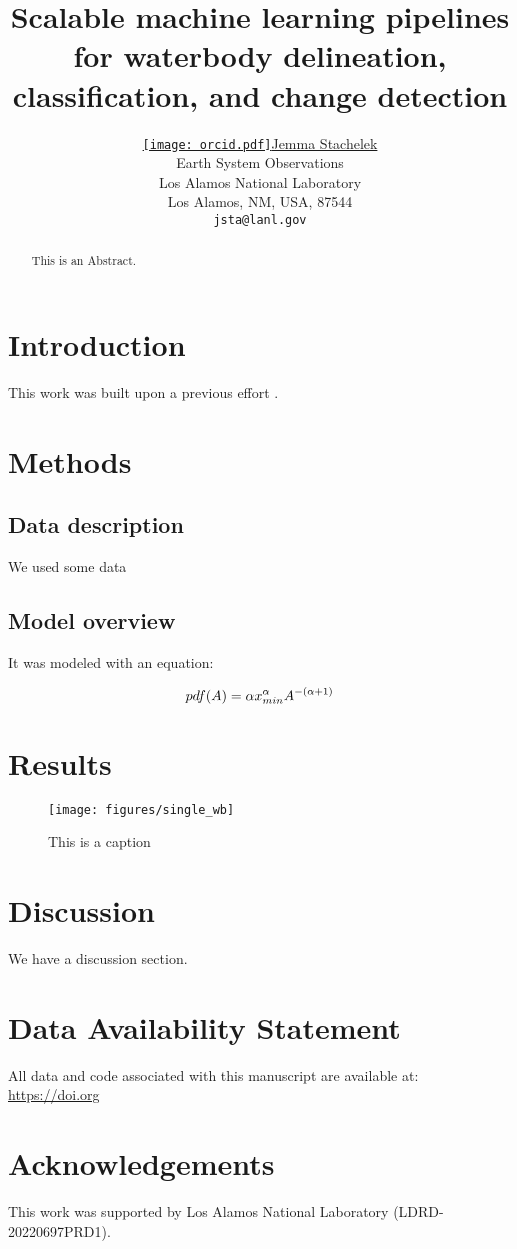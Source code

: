 \documentclass{article}
\title{Scalable machine learning pipelines for waterbody delineation, classification, and change detection}
\date{} 					%
\author{ \href{https://orcid.org/0000-0002-5924-2464}{\texttt{[image: orcid.pdf]}\hspace{1mm}Jemma Stachelek} \\
	Earth System Observations\\
	Los Alamos National Laboratory\\
	Los Alamos, NM, USA, 87544 \\
	\texttt{jsta@lanl.gov} \\
}
\begin{document}
\maketitle

\begin{abstract}
	This is an Abstract.
\end{abstract}

\section{Introduction}
This work was built upon a previous effort \citep{stachelek_hydroml}.

\section{Methods}

\subsection{Data description}

We used some data

\subsection{Model overview}

It was modeled with an equation:

\begin{equation}
	pdf(A) = \alpha x_{min}^{\alpha}A^{-(\alpha+1)} \\
	\label{eqn:pareto_pdf}
\end{equation}

\section{Results}

\begin{figure}
	\centering
	\texttt{[image: figures/single\_wb]}
	\caption{This is a caption}
	\label{fig:predict_censor}
\end{figure}

\section{Discussion}

We have a discussion section.

\section{Data Availability Statement}

All data and code associated with this manuscript are available at: \href{https://doi.org}{https://doi.org}

\section{Acknowledgements}

This work was supported by Los Alamos National Laboratory (LDRD-20220697PRD1).



\end{document}
